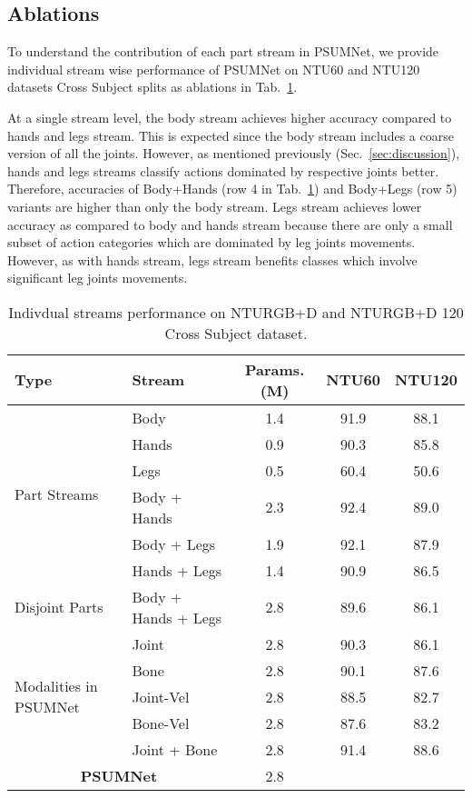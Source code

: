 \documentclass[runningheads]{llncs}
\begin{document}
\subsection{Ablations}
\label{sec:ablation}


To understand the contribution of each part stream in PSUMNet, we provide individual stream wise performance of PSUMNet on NTU60 and NTU120 datasets Cross Subject splits as ablations in Tab.~\ref{tab:ablation_table}.

At a single stream level, the body stream achieves higher accuracy compared to hands and legs stream. This is expected since the body stream includes a coarse version of all the joints. However, as mentioned previously (Sec.~\ref{sec:discussion}), hands and legs streams classify actions dominated by respective joints better. Therefore, accuracies of Body+Hands (row 4 in Tab.~\ref{tab:ablation_table}) and Body+Legs (row 5) variants are higher than  only the body stream. Legs stream achieves lower accuracy as compared to body and hands stream because there are only a small subset of action categories which are dominated by leg joints movements. However, as with hands stream, legs stream benefits classes which involve significant leg joints movements.

\begin{table}[!t]
  \resizebox{0.7\linewidth}{!} 
    {\begin{tabular}{l|l|c|cc}
    \toprule
    Type & Stream & Params. (M) & NTU60 & NTU120\\
    \midrule
    \multirow{6}{3em}{Part Streams} 
    & Body & 1.4 & 91.9 & 88.1\\
    & Hands & 0.9 & 90.3 & 85.8\\
    & Legs & 0.5 & 60.4 & 50.6\\
    & Body + Hands & 2.3 & 92.4 & 89.0\\
    & Body + Legs & 1.9 & 92.1 & 87.9\\
    & Hands + Legs & 1.4 & 90.9 & 86.5\\
    \midrule
    Disjoint Parts & Body + Hands + Legs 
    & 2.8 & 89.6 & 86.1\\
    \midrule
    \multirow{5}{3em}{Modalities in PSUMNet} 
    & Joint & 2.8 & 90.3 & 86.1\\
    & Bone & 2.8 & 90.1 & 87.6\\
    & Joint-Vel & 2.8 & 88.5 & 82.7\\
    & Bone-Vel & 2.8 & 87.6 & 83.2\\
    & Joint + Bone & 2.8 & 91.4 & 88.6\\
    \midrule
    \multicolumn{2}{c|}{\textbf{PSUMNet}} & 2.8 &  & \\
  \bottomrule
 
\end{tabular}
}
 \caption{\label{tab:ablation_table} Indivdual streams performance on NTURGB+D and NTURGB+D 120 Cross Subject dataset.}
  
\end{table}
\end{document}
